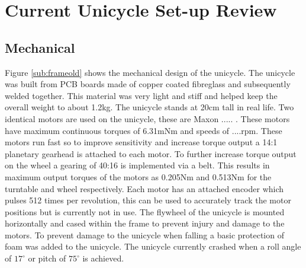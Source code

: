 \documentclass[twoside,twocolumn,12pt]{article}
\begin{document}
\section{Current Unicycle Set-up Review}
\subsection{Mechanical}
Figure \ref{sub:frameold} shows the mechanical design of the unicycle. The unicycle was built from PCB boards made of copper coated fibreglass and subsequently welded together. This material was very light and stiff and helped keep the overall weight to about 1.2kg. The unicycle stands at 20cm tall in real life.
\newline
Two identical motors are used on the unicycle, these are Maxon ..... \cite{maxonmotor}. These motors have maximum continuous torques of 6.31mNm and speeds of ....rpm. These motors run fast so to improve sensitivity and increase torque output a 14:1 planetary gearhead \cite{gearhead} is attached to each motor. To further increase torque output on the wheel a gearing of 40:16 is implemented via a belt. This results in maximum output torques of the motors as 0.205Nm and 0.513Nm for the turntable and wheel respectively. Each motor has an attached encoder which pulses 512 times per revolution, this can be used to accurately track the motor positions but is currently not in use.
\newline
The flywheel of the unicycle is mounted horizontally and cased within the frame to prevent injury and damage to the motors.
\newline
To prevent damage to the unicycle when falling a basic protection of foam was added to the unicycle. The unicycle currently crashed when a roll angle of $17^{\circ}$ or pitch of $75^{\circ}$ is achieved. 
\end{document}
